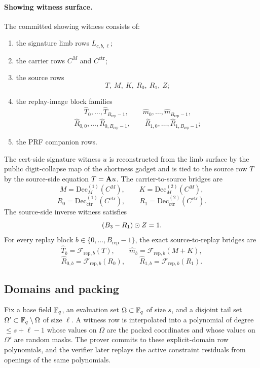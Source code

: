 \paragraph{Showing witness surface.}
The committed showing witness consists of:
\begin{enumerate}[leftmargin=1.25em]
    \item the signature limb rows \(L_{c,b,\ell}\);
    \item the carrier rows \(C^M\) and \(C^{\mathrm{ctr}}\);
    \item the source rows
    \[
    T,\ M,\ K,\ R_0,\ R_1,\ Z;
    \]
    \item the replay-image block families
    \[
    \widehat T_0,\ldots,\widehat T_{B_{\mathrm{rep}}-1},
    \qquad
    \widehat m_0,\ldots,\widehat m_{B_{\mathrm{rep}}-1},
    \]
    \[
    \widehat R_{0,0},\ldots,\widehat R_{0,B_{\mathrm{rep}}-1},
    \qquad
    \widehat R_{1,0},\ldots,\widehat R_{1,B_{\mathrm{rep}}-1};
    \]
    \item the PRF companion rows.
\end{enumerate}
The cert-side signature witness \(u\) is reconstructed from the limb surface by the public digit-collapse map of the
shortness gadget and is tied to the source row \(T\) by the source-side equation \(T=\mathbf{A} u\). The carrier-to-source bridges are
\[
M=\mathrm{Dec}_M^{(1)}(C^M),
\qquad
K=\mathrm{Dec}_M^{(2)}(C^M),
\]
\[
R_0=\mathrm{Dec}_{\mathrm{ctr}}^{(1)}(C^{\mathrm{ctr}}),
\qquad
R_1=\mathrm{Dec}_{\mathrm{ctr}}^{(2)}(C^{\mathrm{ctr}}).
\]
The source-side inverse witness satisfies
\[
(B_3-R_1)\odot Z = 1.
\]
For every replay block \(b\in\{0,\ldots,B_{\mathrm{rep}}-1\}\), the exact source-to-replay bridges are
\[
\widehat T_b = \mathcal F_{\mathrm{rep},b}(T),
\qquad
\widehat m_b = \mathcal F_{\mathrm{rep},b}(M+K),
\]
\[
\widehat R_{0,b} = \mathcal F_{\mathrm{rep},b}(R_0),
\qquad
\widehat R_{1,b} = \mathcal F_{\mathrm{rep},b}(R_1).
\]

\subsection{Domains and packing}
Fix a base field \(\mathbb{F}_q\), an evaluation set \(\Omega\subset\mathbb{F}_q\) of size
\(s\), and a disjoint tail set \(\Omega'\subset\mathbb{F}_q\setminus\Omega\) of size
\(\ell\). A witness row is interpolated into a polynomial of degree
\(\le s+\ell-1\) whose values on \(\Omega\) are the packed coordinates and
whose values on \(\Omega'\) are random masks. The prover commits to these
explicit-domain row polynomials, and the verifier later replays the active
constraint residuals from openings of the same polynomials.

